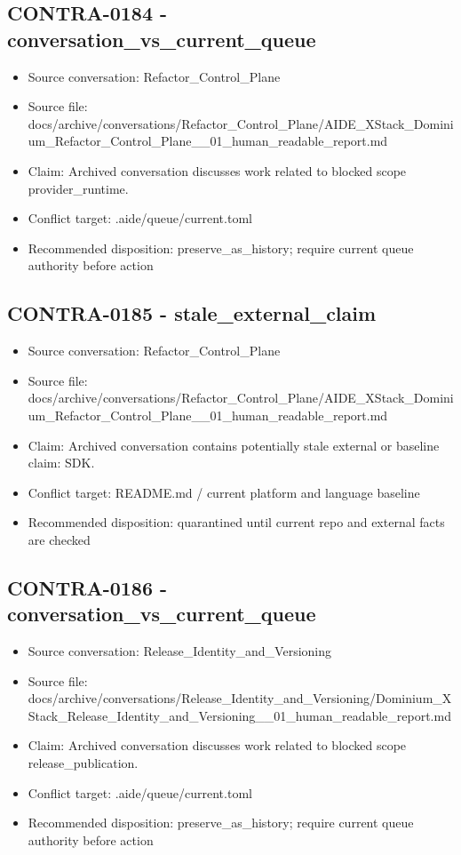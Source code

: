 \documentclass[11pt,a4paper]{report}
\begin{document}
\subsection{CONTRA-0184 - conversation\_vs\_current\_queue}

\begin{itemize}
\item Source conversation: Refactor\_Control\_Plane
\item Source file: docs/archive/conversations/Refactor\_Control\_Plane/AIDE\_XStack\_Dominium\_Refactor\_Control\_Plane\_\_01\_human\_readable\_report.md
\item Claim: Archived conversation discusses work related to blocked scope provider\_runtime.
\item Conflict target: .aide/queue/current.toml
\item Recommended disposition: preserve\_as\_history; require current queue authority before action
\end{itemize}

\subsection{CONTRA-0185 - stale\_external\_claim}

\begin{itemize}
\item Source conversation: Refactor\_Control\_Plane
\item Source file: docs/archive/conversations/Refactor\_Control\_Plane/AIDE\_XStack\_Dominium\_Refactor\_Control\_Plane\_\_01\_human\_readable\_report.md
\item Claim: Archived conversation contains potentially stale external or baseline claim: SDK.
\item Conflict target: README.md / current platform and language baseline
\item Recommended disposition: quarantined until current repo and external facts are checked
\end{itemize}

\subsection{CONTRA-0186 - conversation\_vs\_current\_queue}

\begin{itemize}
\item Source conversation: Release\_Identity\_and\_Versioning
\item Source file: docs/archive/conversations/Release\_Identity\_and\_Versioning/Dominium\_XStack\_Release\_Identity\_and\_Versioning\_\_01\_human\_readable\_report.md
\item Claim: Archived conversation discusses work related to blocked scope release\_publication.
\item Conflict target: .aide/queue/current.toml
\item Recommended disposition: preserve\_as\_history; require current queue authority before action
\end{itemize}
\end{document}
